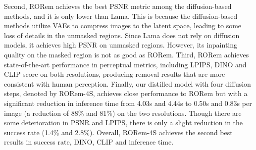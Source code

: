 \documentclass[10pt,twocolumn,letterpaper]{article}
\begin{document}
Second, RORem achieves the best PSNR metric among the diffusion-based methods, and it is only lower than Lama. This is because the diffusion-based methods utilize VAEs to compress images to the latent space, leading to some loss of details in the unmasked regions. Since Lama does not rely on diffusion models, it achieves high PSNR on unmasked regions. However, its inpainting quality on the masked region is not as good as RORem. 
Third, RORem achieves state-of-the-art performance in perceptual metrics, including LPIPS, DINO and CLIP score on both resolutions, producing removal results that are more consistent with human perception. Finally, our distilled model with four diffusion steps, denoted by RORem-4S, achieves close performance to RORem but with a significant reduction in inference time from 4.03s and 4.44s to 0.50s and 0.83s per image (a reduction of 88\% and 81\%) on the two resolutions. Though there are some deterioration in PSNR and LPIPS, there is only a slight reduction in the success rate (1.4\% and 2.8\%). Overall, RORem-4S achieves the second best results in success rate, DINO, CLIP and inference time.
\end{document}
